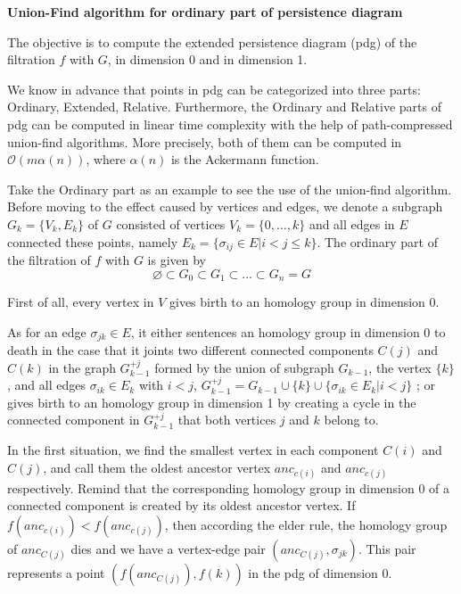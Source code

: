 \documentclass[a4paper,12pt]{article}
\numberwithin{equation}{section}
\begin{document}
	\noindent
	\textbf{Union-Find algorithm for ordinary part of persistence diagram}
	
	The objective is to compute the extended persistence diagram (pdg) of the filtration $f$ with $G$, in dimension 0 and in dimension 1.
		
	We know in advance that points in pdg can be categorized into three parts: Ordinary, Extended, Relative. Furthermore, the Ordinary and Relative parts of pdg can be computed in linear time complexity with the help of path-compressed union-find algorithms. More precisely, both of them can be computed in $\mathcal{O}(m \alpha(n) )$, where $\alpha(n)$ is the Ackermann function.
	
	Take the Ordinary part as an example to see the use of the union-find algorithm. Before moving to the effect caused by vertices and edges, we denote a subgraph $G_k = \{V_k, E_k\}$ of $G$ consisted of vertices $V_k = \{0,\ldots,k\}$ and all edges in $E$ connected these points, namely $E_k = \{\sigma_{ij} \in E \vert i<j \leq k\}$. The ordinary part of the filtration of $f$ with $G$ is given by
	$$ \varnothing \subset G_0 \subset G_1 \subset \ldots \subset G_n = G $$
	
	First of all, every vertex in $V$ gives birth to an homology group in dimension 0.
	
	As for an edge $\sigma_{jk} \in E$, it either sentences an homology group in dimension 0 to death in the case that it joints two different connected components $C(j)$ and $C(k)$ in the graph $G_{k-1}^{+j}$ formed by the union of subgraph $G_{k-1}$, the vertex $\{k\}$, and all edges $\sigma_{ik} \in E_k$ with $i < j$, $G_{k-1}^{+j}= G_{k-1} \cup \{k\}\cup \{ \sigma_{ik} \in E_k \vert i<j \}$ ; or gives birth to an homology group in dimension 1 by creating a cycle in the connected component in $G_{k-1}^{+j}$ that both vertices $j$ and $k$ belong to.
	
	In the first situation, we find the smallest vertex in each component $C(i)$ and $C(j)$, and call them the oldest ancestor vertex $anc_{c(i)}$ and $anc_{c(j)}$ respectively. Remind that the corresponding homology group in dimension 0 of a connected component is created by its oldest ancestor vertex. If $f( anc_{c(i)} ) < f ( anc_{c(j)} )$, then according the elder rule, the homology group of $anc_{C(j)}$ dies and we have a vertex-edge pair $(anc_{C(j)}, \sigma_{jk})$. This pair represents a point $(f(anc_{C(j)}), f(k))$ in the pdg of dimension 0.
	
\end{document}
